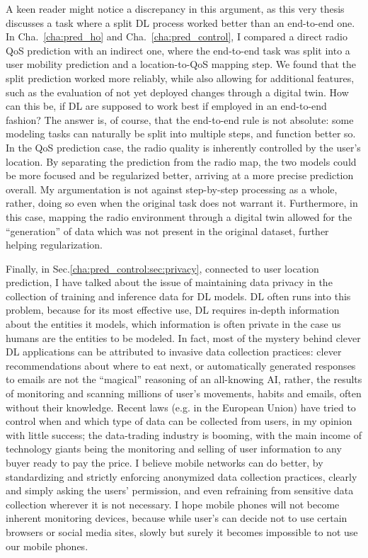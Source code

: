 			A keen reader might notice a discrepancy in this argument, as this very thesis discusses a task where a split \ac{DL} process worked better than an end-to-end one.
			In Cha.~\ref{cha:pred_ho} and Cha.~\ref{cha:pred_control}, I compared a direct radio \ac{QoS} prediction with an indirect one, where the end-to-end task was split into a user mobility prediction and a location-to-\ac{QoS} mapping step.
			We found that the split prediction worked more reliably, while also allowing for additional features, such as the evaluation of not yet deployed changes through a digital twin.
			How can this be, if \ac{DL} are supposed to work best if employed in an end-to-end fashion?
			The answer is, of course, that the end-to-end rule is not absolute: some modeling tasks can naturally be split into multiple steps, and function better so.			
			In the \ac{QoS} prediction case, the radio quality is inherently controlled by the user's location.
			By separating the prediction from the radio map, the two models could be more focused and be regularized better, arriving at a more precise prediction overall.
			My argumentation is not against step-by-step processing as a whole, rather, doing so even when the original task does not warrant it.
			Furthermore, in this case, mapping the radio environment through a digital twin allowed for the ``generation'' of data which was not present in the original dataset, further helping regularization.
			
			Finally, in Sec.\ref{cha:pred_control:sec:privacy}, connected to user location prediction, I have talked about the issue of maintaining data privacy in the collection of training and inference data for \ac{DL} models.
			\ac{DL} often runs into this problem, because for its most effective use, \ac{DL} requires in-depth information about the entities it models,	which information is often private in the case us humans are the entities to be modeled.	
			In fact, most of the mystery behind clever \ac{DL} applications can be attributed to invasive data collection practices: clever recommendations about where to eat next, or automatically generated responses to emails are not the ``magical'' reasoning of an all-knowing \ac{AI}, rather, the results of monitoring and scanning millions of user's movements, habits and emails, often without their knowledge.
			Recent laws (e.g. in the European Union) have tried to control when and which type of data can be collected from users, in my opinion with little success; the data-trading industry is booming, with the main income of technology giants being the monitoring and selling of user information to any buyer ready to pay the price.			
			I believe mobile networks can do better, by standardizing and strictly enforcing anonymized data collection practices, clearly and simply asking the users' permission, and even refraining from sensitive data collection wherever it is not necessary.
			I hope mobile phones will not become inherent monitoring devices, because while user's can decide not to use certain browsers or social media sites, slowly but surely it becomes impossible to not use our mobile phones.
	

